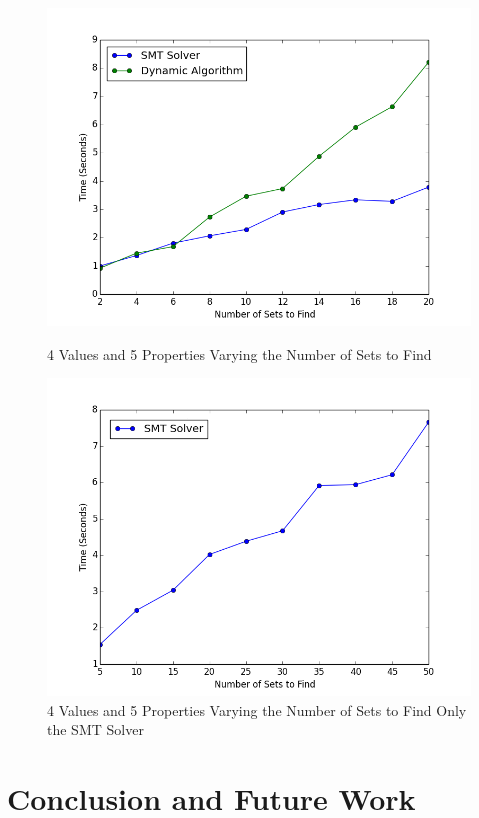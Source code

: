 \documentclass[pageno]{jpaper}
\begin{document}
\begin{figure}[htbb]
\begin{minipage}[b]{0.5\linewidth}
\centering
\includegraphics[width=.75\linewidth]{DvSSETS-v4p5n2468101214161820.png}
\caption{4 Values and 5 Properties Varying the Number of Sets to Find}
\label{fig:DvSSETS}
\end{minipage}
\hspace{0.5cm}
\begin{minipage}[b]{0.5\linewidth}
\centering
\includegraphics[width=.75\linewidth]{SMTOnlySETS-v4p5n5101520253035404550.png}
\caption{4 Values and 5 Properties Varying the Number of Sets to Find Only the SMT Solver}
\label{fig:SMTSet}
\end{minipage}
\end{figure}








\section{Conclusion and Future Work}
\end{document}
